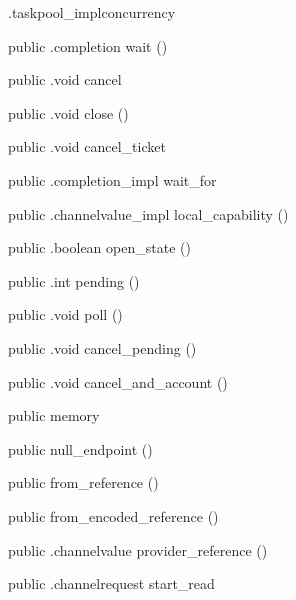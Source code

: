 \begin{CrexxClass}{.taskpool\_impl}{concurrency}
\begin{Members}
    \Method
      {public}
      {.completion}
      {wait}
      {()}

    \Method
      {public}
      {.void}
      {cancel}
      {}

    \Method
      {public}
      {.void}
      {close}
      {()}

    \Method
      {public}
      {.void}
      {cancel\_ticket}
      {}

    \Method
      {public}
      {.completion\_impl}
      {wait\_for}
      {}

    \Method
      {public}
      {.channelvalue\_impl}
      {local\_capability}
      {()}

    \Method
      {public}
      {.boolean}
      {open\_state}
      {()}

    \Method
      {public}
      {.int}
      {pending}
      {()}

    \Method
      {public}
      {.void}
      {poll}
      {()}

    \Method
      {public}
      {.void}
      {cancel\_pending}
      {()}

    \Method
      {public}
      {.void}
      {cancel\_and\_account}
      {()}

    \Factory
      {public}
      {memory}
      {}

    \Factory
      {public}
      {null\_endpoint}
      {()}

    \Factory
      {public}
      {from\_reference}
      {()}

    \Factory
      {public}
      {from\_encoded\_reference}
      {()}

    \Method
      {public}
      {.channelvalue}
      {provider\_reference}
      {()}

    \Method
      {public}
      {.channelrequest}
      {start\_read}
      {}


\end{Members}
\end{CrexxClass}

